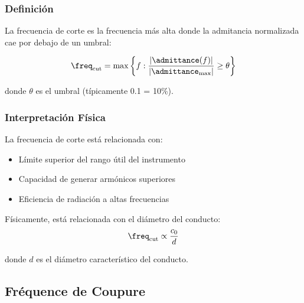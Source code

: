 \subsubsection{Definición}

La frecuencia de corte es la frecuencia más alta donde la admitancia normalizada cae por debajo de un umbral:

\begin{equation}
\freq_{\text{cut}} = \max\left\{f : \frac{|\admittance(f)|}{|\admittance_{\max}|} \geq \theta\right\}
\label{eq:cutoff_freq}
\end{equation}

donde $\theta$ es el umbral (típicamente 0.1 = 10\%).

\subsubsection{Interpretación Física}

La frecuencia de corte está relacionada con:

\begin{itemize}
    \item Límite superior del rango útil del instrumento
    \item Capacidad de generar armónicos superiores
    \item Eficiencia de radiación a altas frecuencias
\end{itemize}

Físicamente, está relacionada con el diámetro del conducto:
\begin{equation}
\freq_{\text{cut}} \propto \frac{c_0}{d}
\end{equation}

donde $d$ es el diámetro característico del conducto.

\subsection{Fréquence de Coupure}


